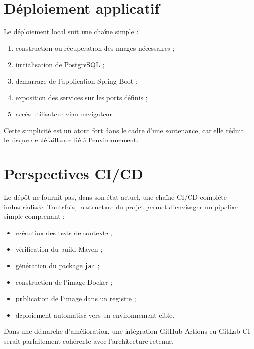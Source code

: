 \begin{codeblock}[H]
\caption{Configuration applicative Spring Boot}

\end{codeblock}

\section{Déploiement applicatif}
Le déploiement local suit une chaîne simple :
\begin{enumerate}
  \item construction ou récupération des images nécessaires ;
  \item initialisation de PostgreSQL ;
  \item démarrage de l'application Spring Boot ;
  \item exposition des services sur les ports définis ;
  \item accès utilisateur viau navigateur.
\end{enumerate}

Cette simplicité est un atout fort dans le cadre d'une soutenance, car elle réduit le risque de défaillance lié à l'environnement.

\section{Perspectives CI/CD}
Le dépôt ne fournit pas, dans son état actuel, une chaîne CI/CD complète industrialisée. Toutefois, la structure du projet permet d'envisager un pipeline simple comprenant :
\begin{itemize}
  \item exécution des tests de contexte ;
  \item vérification du build Maven ;
  \item génération du package \texttt{jar} ;
  \item construction de l'image Docker ;
  \item publication de l'image dans un registre ;
  \item déploiement automatisé vers un environnement cible.
\end{itemize}

Dans une démarche d'amélioration, une intégration GitHub Actions ou GitLab CI serait parfaitement cohérente avec l'architecture retenue.

